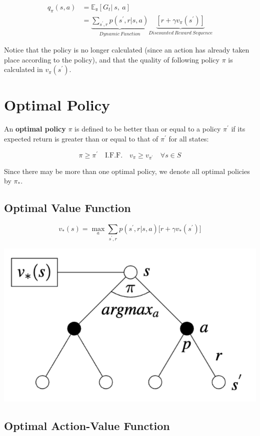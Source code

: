 \documentclass[
  letterpaper,
  DIV=11,
  numbers=noendperiod]{scrreprt}
\begin{document}
\[
\begin{align}
    q_{\pi}(s, a) & = \mathbb{E_{\pi}}[G_{t}| \ s, \ a] \\
     & = \underbrace{\sum_{s^{'}, r} p(s^{'},r|s,a)}_{Dynamic \ Function} \underbrace{[r + \gamma v_{\pi}(s^{'})]}_{Discounted \ Reward \  Sequence}
\end{align}
\]

Notice that the policy is no longer calculated (since an action has
already taken place according to the policy), and that the quality of
following policy \(\pi\) is calculated in \(v_{\pi}(s^{'})\).

\section{Optimal Policy}\label{optimal-policy}

An \textbf{optimal policy} \(\pi\) is defined to be better than or equal
to a policy \(\pi^{'}\) if its expected return is greater than or equal
to that of \(\pi^{'}\) for all states:

\[
\pi \geq \pi^{'} \quad \text{I.F.F.} \quad v_{\pi} \geq v_{\pi^{'}} \quad \forall s \in S
\]

Since there may be more than one optimal policy, we denote all optimal
policies by \(\pi_{*}\).

\subsection{Optimal Value Function}\label{optimal-value-function}

\[
v_{*}(s) = \max_{a} \sum_{s^{'}, r} p(s^{'},r|s,a) \big[ r + \gamma v_{*}(s^{'}) \big]
\]

\begin{center}
\includegraphics[width=0.35\linewidth,height=\textheight,keepaspectratio]{lecture4/images/OptimValue.png}
\end{center}

\subsection{Optimal Action-Value
Function}\label{optimal-action-value-function}
\end{document}
